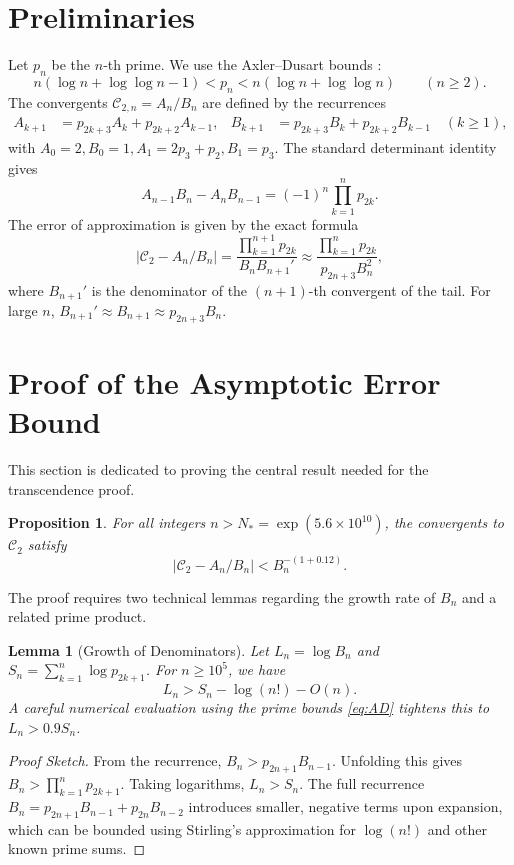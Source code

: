 \documentclass[11pt,a4paper]{article}
\newtheorem{lemma}[theorem]{Lemma}
\newtheorem{proposition}[theorem]{Proposition}
\theoremstyle{definition}
\theoremstyle{remark}
\newcommand{\C}{\mathcal{C}}
\begin{document}
\section{Preliminaries}
Let $p_n$ be the $n$‑th prime. We use the Axler–Dusart bounds \cite{Axler2013,Dusart2018}:
\begin{equation}\label{eq:AD}
  n(\log n+\log\log n-1)<p_n<n(\log n+\log\log n)\qquad(n\ge2).
\end{equation}
The convergents $\C_{2,n}=A_n/B_n$ are defined by the recurrences
\begin{align*}
A_{k+1}&=p_{2k+3}A_k+p_{2k+2}A_{k-1},&
B_{k+1}&=p_{2k+3}B_k+p_{2k+2}B_{k-1}\quad(k\ge1),
\end{align*}
with $A_0=2, B_0=1, A_1=2p_3+p_2, B_1=p_3$. The standard determinant identity gives
\begin{equation}\label{eq:det}
A_{n-1}B_n-A_nB_{n-1}=(-1)^n\prod_{k=1}^{n}p_{2k}.
\end{equation}
The error of approximation is given by the exact formula
\begin{equation}\label{eq:errExact}
|\C_2-A_n/B_n| = \frac{\prod_{k=1}^{n+1}p_{2k}}{B_n B_{n+1}'} \approx \frac{\prod_{k=1}^{n}p_{2k}}{p_{2n+3}B_n^2},
\end{equation}
where $B_{n+1}'$ is the denominator of the $(n+1)$-th convergent of the tail. For large $n$, $B_{n+1}' \approx B_{n+1} \approx p_{2n+3}B_n$.

\section{Proof of the Asymptotic Error Bound}\label{sec:proof-of-bound}
This section is dedicated to proving the central result needed for the transcendence proof.
\begin{proposition}\label{prop:asymptotic}
For all integers $n > N_{\!*} = \exp(5.6\times10^{10})$, the convergents to $\C_2$ satisfy
\[ |\C_2 - A_n/B_n| < B_n^{-(1+0.12)}. \]
\end{proposition}

The proof requires two technical lemmas regarding the growth rate of $B_n$ and a related prime product.

\begin{lemma}[Growth of Denominators]\label{lem:BnLower}
Let $L_n = \log B_n$ and $S_n = \sum_{k=1}^{n} \log p_{2k+1}$. For $n \ge 10^5$, we have
\[ L_n > S_n - \log(n!) - O(n). \]
A careful numerical evaluation using the prime bounds \eqref{eq:AD} tightens this to $L_n > 0.9 S_n$.
\end{lemma}
\begin{proof}[Proof Sketch]
From the recurrence, $B_n > p_{2n+1}B_{n-1}$. Unfolding this gives $B_n > \prod_{k=1}^n p_{2k+1}$. Taking logarithms, $L_n > S_n$. The full recurrence $B_n = p_{2n+1}B_{n-1} + p_{2n}B_{n-2}$ introduces smaller, negative terms upon expansion, which can be bounded using Stirling's approximation for $\log(n!)$ and other known prime sums.
\end{proof}
\end{document}

